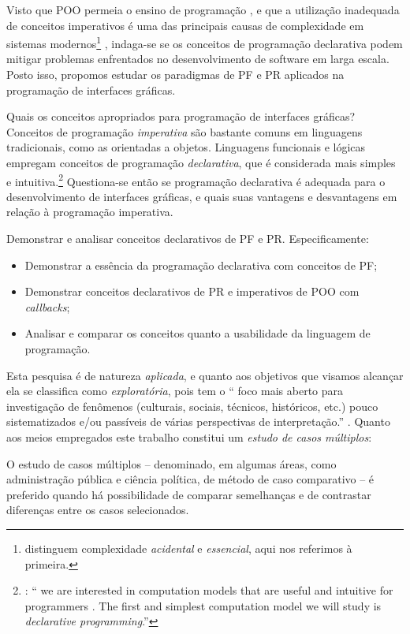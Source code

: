 Visto que POO permeia o ensino de programação \cite{vanroy2003}, e que a
utilização inadequada de conceitos imperativos é uma das principais causas de
complexidade em sistemas modernos\footnote{\textcite{moseley2006} distinguem complexidade \emph{acidental} e
\emph{essencial}, aqui nos referimos à primeira.} \cite{moseley2006}, indaga-se se
os conceitos de programação declarativa podem mitigar problemas enfrentados no
desenvolvimento de software em larga escala.
Posto isso, propomos estudar os paradigmas de PF e PR aplicados na programação
de interfaces gráficas.

Quais os conceitos apropriados para programação de interfaces gráficas?
Conceitos de programação \emph{imperativa} são bastante comuns em linguagens
tradicionais, como as orientadas a objetos.
Linguagens funcionais e lógicas empregam conceitos de programação
\emph{declarativa}, que é considerada mais simples e intuitiva.\footnote{\textcite[p. 31]{roy2004}: “\textelp{} we are interested in
computation models that are useful and intuitive for programmers \textelp{}. The
first and simplest computation model we will study is \emph{declarative
programming}.”}
Questiona-se então se programação declarativa é adequada para o
desenvolvimento de interfaces gráficas, e quais suas vantagens e desvantagens
em relação à programação imperativa.

Demonstrar e analisar conceitos declarativos de PF e PR. Especificamente:

\begin{itemize}
\item Demonstrar a essência da programação declarativa com conceitos de PF;
\item Demonstrar conceitos declarativos de PR e imperativos de POO com
\emph{callbacks};
\item Analisar e comparar os conceitos quanto a usabilidade da linguagem de
programação.
\end{itemize}

Esta pesquisa é de natureza \emph{aplicada}, e quanto aos objetivos que visamos
alcançar ela se classifica como \emph{exploratória}, pois tem o “\textelp{} foco
mais aberto para investigação de fenômenos (culturais, sociais, técnicos,
históricos, etc.) pouco sistematizados e/ou passíveis de várias perspectivas
de interpretação.” \cite[p. 32]{leal2011}.
Quanto aos meios empregados este trabalho constitui um \emph{estudo de casos
múltiplos}:

\begin{citacao}
  O estudo de casos múltiplos – denominado, em algumas áreas, como
  administração pública e ciência política, de método de caso comparativo – é
  preferido quando há possibilidade de comparar semelhanças e de contrastar
  diferenças entre os casos selecionados. \cite[p. 43]{leal2011}
\end{citacao}


